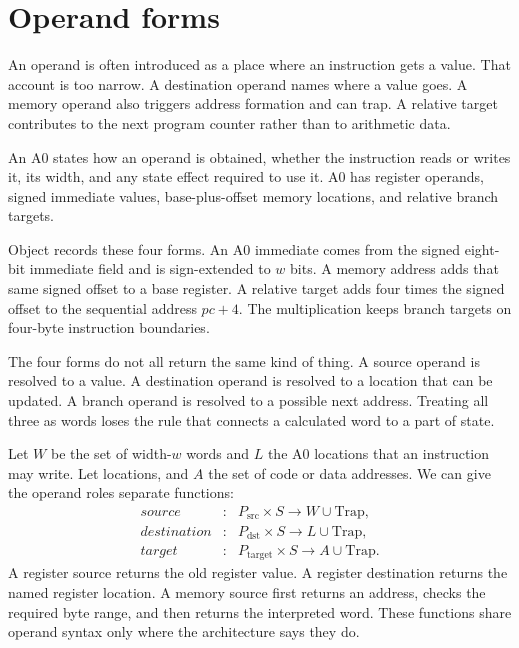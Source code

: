 \section{Operand forms}

An operand is often introduced as a place where an instruction gets a value.
That account is too narrow. A destination operand names where a value goes. A
memory operand also triggers address formation and can trap. A relative target
contributes to the next program counter rather than to arithmetic data.

\begin{definition}[title={Operand form}]
An A0  states how an operand is obtained, whether the
instruction reads or writes it, its width, and any state effect required to
use it. A0 has register operands, signed immediate values, base-plus-offset
memory locations, and relative branch targets.
\end{definition}

Object  records these four forms. An A0 immediate comes
from the signed eight-bit immediate field and is sign-extended to \(w\) bits.
A memory address adds that same signed offset to a base register. A relative
target adds four times the signed offset to the sequential address \(pc+4\).
The multiplication keeps branch targets on four-byte instruction boundaries.

The four forms do not all return the same kind of thing. A source operand is
resolved to a value. A destination operand is resolved to a location that can
be updated. A branch operand is resolved to a possible next address. Treating
all three as words loses the rule that connects a calculated word to a part of
state.

Let \(W\) be the set of width-\(w\) words and \(L\) the A0 locations that an
instruction may write. Let
locations, and \(A\) the set of code or data addresses. We can give the
operand roles separate functions:
\[
 \begin{array}{rcl}
 \mathit{source} &:& P_{\mathrm{src}}\mathbin{\times}S
                       \longrightarrow W\mathbin{\cup}\mathrm{Trap},\\
 \mathit{destination} &:& P_{\mathrm{dst}}\mathbin{\times}S
                       \longrightarrow L\mathbin{\cup}\mathrm{Trap},\\
 \mathit{target} &:& P_{\mathrm{target}}\mathbin{\times}S
                       \longrightarrow A\mathbin{\cup}\mathrm{Trap}.
 \end{array}
\]
A register source returns the old register value. A register destination
returns the named register location. A memory source first returns an address,
checks the required byte range, and then returns the interpreted word. These
functions share operand syntax only where the architecture says they do.

